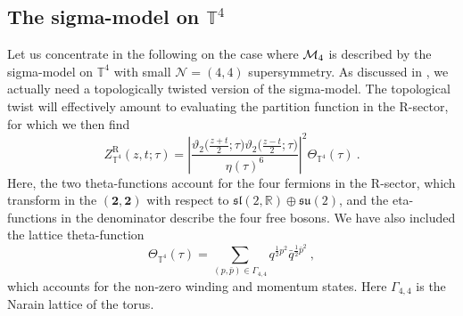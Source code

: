 \documentclass[12pt,a4paper]{article}
\newcommand{\be}{\begin{equation}}
\newcommand{\ee}{\end{equation}}
\begin{document}
\subsection{The sigma-model on $\mathbb{T}^4$} \label{subsec:sigma model on T4}
Let us concentrate in the following on the case where ${\cal M}_4$ is described by the sigma-model on $\mathbb{T}^4$ with small $\mathcal{N}=(4,4)$ supersymmetry. As discussed in \cite{Berkovits:1999im}, we actually need a topologically twisted version of the sigma-model. The topological twist will effectively amount to evaluating the partition function in the R-sector, for which we then find 
\be 
Z_{\mathbb{T}^4}^\text{R}(z,t;\tau)=\left|\frac{\vartheta_2\big(\frac{z+t}{2};\tau\big)\vartheta_2\big(\frac{z-t}{2};\tau\big)}{\eta(\tau)^6}\right|^2 \Theta_{\mathbb{T}^4}(\tau)\ . \label{eq:sigma model T4 partition function}
\ee
Here, the two theta-functions account for the four fermions in the R-sector, which transform in the $(\mathbf{2},\mathbf{2})$ with respect to $\mathfrak{sl}(2,\mathds{R})\oplus \mathfrak{su}(2)$, and the eta-functions in the denominator describe the four free bosons. We have also included the lattice theta-function 
\be
\Theta_{\mathbb{T}^4}(\tau)=\sum_{(p,\bar{p}) \in \Gamma_{4,4}} q^{\frac{1}{2}p^2} \bar{q}^{\frac{1}{2}\bar{p}^2}\ ,
\ee
which accounts for the non-zero winding and momentum states. Here $\Gamma_{4,4}$ is the Narain lattice of the torus.
\end{document}
